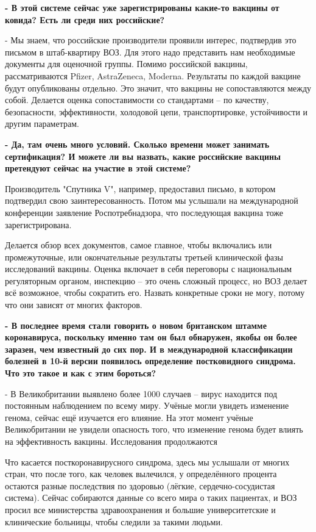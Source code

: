 \textbf{- В этой системе сейчас уже зарегистрированы какие-то вакцины от ковида? Есть
ли среди них российские?}

- Мы знаем, что российские производители проявили интерес, подтвердив это
письмом в штаб-квартиру ВОЗ. Для этого надо представить нам необходимые
документы для оценочной группы. Помимо российской вакцины, рассматриваются
Pfizer, AstraZeneca, Moderna. Результаты по каждой вакцине будут опубликованы
отдельно. Это значит, что вакцины не сопоставляются между собой. Делается
оценка сопоставимости со стандартами – по качеству, безопасности,
эффективности, холодовой цепи, транспортировке, устойчивости и другим
параметрам.

\textbf{- Да, там очень много условий. Сколько времени может занимать сертификация? И
можете ли вы назвать, какие российские вакцины претендуют сейчас на участие в
этой системе?}

Производитель "Спутника V", например, предоставил письмо, в котором подтвердил
свою заинтересованность. Потом мы услышали на международной конференции
заявление Роспотребнадзора, что последующая вакцина тоже зарегистрирована.

Делается обзор всех документов, самое главное, чтобы включались или
промежуточные, или окончательные результаты третьей клинической фазы
исследований вакцины. Оценка включает в себя переговоры с национальным
регуляторным органом, инспекцию – это очень сложный процесс, но ВОЗ делает всё
возможное, чтобы сократить его. Назвать конкретные сроки не могу, потому что
они зависят от многих факторов.

\textbf{- В последнее время стали говорить о новом британском штамме коронавируса,
поскольку именно там он был обнаружен, якобы он более заразен, чем известный до
сих пор. И в международной классификации болезней в 10-й версии появилось
определение постковидного синдрома. Что это такое и как с этим бороться?}

- В Великобритании выявлено более 1000 случаев – вирус находится под постоянным
наблюдением по всему миру. Учёные могли увидеть изменение генома, сейчас ещё
изучается его влияние. На этот момент учёные Великобритании не увидели
опасность того, что изменение генома будет влиять на эффективность вакцины.
Исследования продолжаются

Что касается посткоронавирусного синдрома, здесь мы услышали от многих стран,
что после того, как человек вылечился, у определённого процента остаются разные
последствия по здоровью (лёгкие, сердечно-сосудистая система). Сейчас
собираются данные со всего мира о таких пациентах, и ВОЗ просил все
министерства здравоохранения и большие университетские и клинические больницы,
чтобы следили за такими людьми.

